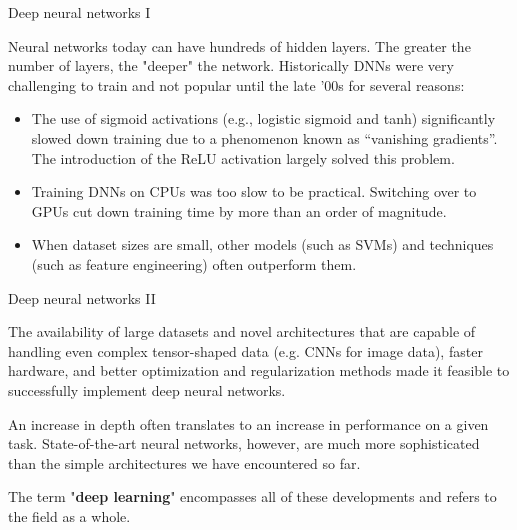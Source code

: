 \documentclass[11pt,compress,t,notes=noshow, xcolor=table]{beamer}
\begin{document}
\begin{framei}{Deep neural networks I}

\item Neural networks today can have %
hundreds of hidden layers. The greater the number of layers, the "deeper" the network. Historically %
DNNs were very challenging to train and not popular until the late '00s for several reasons:
\vfill

\begin{itemize}
\item %
The use of sigmoid activations (e.g., logistic sigmoid and tanh) significantly slowed down training due to a phenomenon known as \enquote{vanishing gradients}. The introduction of the ReLU activation largely solved this problem.
\item Training DNNs on CPUs was too slow to be practical. Switching over to GPUs cut down training time by more than an order of magnitude.
\item When dataset sizes are small, other models (such as SVMs) and techniques (such as feature engineering) often outperform them. 
\end{itemize}

\end{framei}

\begin{framei}[sep=L]{Deep neural networks II}

\item The availability of large datasets and novel architectures that are capable of handling even complex tensor-shaped data (e.g. CNNs for image data), faster hardware, and better optimization and regularization methods made it feasible to successfully implement deep neural networks.%

\item An increase in depth often translates to an increase in performance on a given task. State-of-the-art neural networks, however, are much more sophisticated than the simple architectures we have encountered so far.

\item The term "\textbf{deep learning}" encompasses all of these developments and refers to the field as a whole.
\end{framei}

\endlecture
\end{document}
